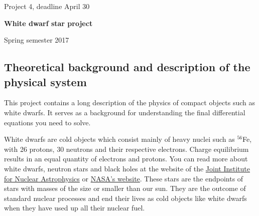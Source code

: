 \documentclass[%
oneside,                 %
final,                   %
10pt]{article}
\begin{document}

\newcommand{\exercisesection}[1]{\subsection*{#1}}






\thispagestyle{empty}

\begin{center}
{\LARGE\bf
\begin{spacing}{1.25}
Project 4, deadline  April 30
\end{spacing}
}
\end{center}


\begin{center}
{\bf White dwarf star  project${}^{}$} \\ [0mm]
\end{center}

\begin{center}
\end{center}
    

\begin{center}
Spring semester 2017
\end{center}

\vspace{1cm}


\subsection*{Theoretical background and description of the physical system}

This project contains a long description of the physics of compact objects such as white dwarfs.
It serves as a background for understanding the final differential equations you need to solve.

White dwarfs are cold objects which consist mainly of heavy nuclei such as $^{56}$Fe, with 26 protons, 30 neutrons
and  their respective electrons.  Charge equilibrium results in an equal quantity of electrons and protons.
You can read more about white dwarfs, neutron stars and black holes at the website of the
\href{{http://www.jinaweb.org}}{Joint Institute for Nuclear Astrophysics} or \href{{http://www.nasa.org}}{NASA's website}.
These stars are the endpoints of stars with masses of the size or smaller than our sun. 
They are the outcome of standard nuclear processes and end their lives as 
cold objects like white dwarfs when they have used up all their nuclear fuel.
\end{document}
